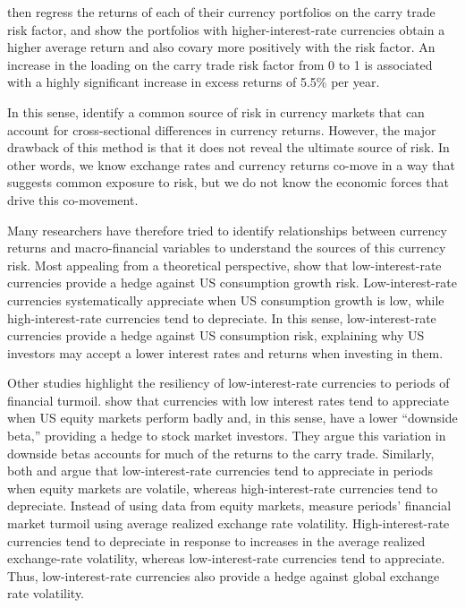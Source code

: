 \documentclass{ar-1col}
\begin{document}
\citet{LustigRoussanovVerdelhan2011} then regress the returns of each of their currency portfolios on the carry trade risk factor, and show the portfolios with higher-interest-rate currencies obtain a higher average return and also covary more positively with the risk factor. An increase in the loading on the carry trade risk factor from 0 to 1 is associated with a highly significant increase in excess returns of 5.5\% per year.

In this sense, \citet{LustigRoussanovVerdelhan2011} identify a common source of risk in currency markets that can account for cross-sectional differences in currency returns. However, the major drawback of this method is that it does not reveal the ultimate source of risk. In other words, we know exchange rates and currency returns co-move in a way that suggests common exposure to risk, but we do not know the economic forces that drive this co-movement.

Many researchers have therefore tried to identify relationships between currency returns and macro-financial variables to understand the sources of this currency risk. Most appealing from a theoretical perspective, \citet{LustigVerdelhan2007} show that low-interest-rate currencies provide a hedge against US consumption growth risk. Low-interest-rate currencies systematically appreciate when US consumption growth is low, while high-interest-rate currencies tend to depreciate. In this sense, low-interest-rate currencies provide a hedge against US consumption risk, explaining why US investors may accept a lower interest rates and returns when investing in them.

Other studies highlight the resiliency of low-interest-rate currencies to periods of financial turmoil. \cite{lettau2014conditional} show that currencies with low interest rates tend to appreciate when US equity markets perform badly and, in this sense, have a lower ``downside beta,'' providing a hedge to stock market investors. They argue this variation in downside betas accounts for much of the returns to the carry trade. Similarly, both \citet{LustigRoussanovVerdelhan2011} and \citet{CampbellMedeirosViceira2010} argue that low-interest-rate currencies tend to appreciate in periods when equity markets are volatile, whereas high-interest-rate currencies tend to depreciate. Instead of using data from equity markets, \citet{Menkhoffetal2012} measure periods' financial market turmoil using average realized exchange rate volatility. High-interest-rate currencies tend to depreciate in response to increases in the average realized exchange-rate volatility, whereas low-interest-rate currencies tend to appreciate. Thus, low-interest-rate currencies also provide a hedge against global exchange rate volatility. 
\end{document}
